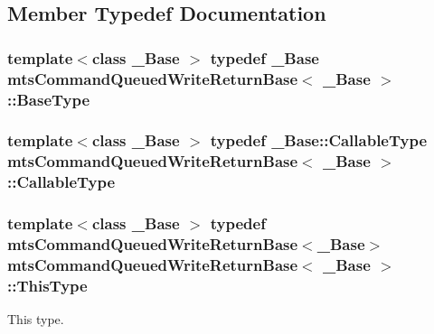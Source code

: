 \subsection{Member Typedef Documentation}
\hypertarget{classmts_command_queued_write_return_base_a1c16e3d09d9bb0071bb50f31ba81b4a8}{
\subsubsection[{Base\-Type}]{\setlength{\rightskip}{0pt plus 5cm}template$<$class \-\_\-\-Base $>$ typedef \-\_\-\-Base {\bf mts\-Command\-Queued\-Write\-Return\-Base}$<$ \-\_\-\-Base $>$\-::{\bf Base\-Type}}}\label{classmts_command_queued_write_return_base_a1c16e3d09d9bb0071bb50f31ba81b4a8}
\hypertarget{classmts_command_queued_write_return_base_aa8635b9bab77a8e15f53f9f80415c420}{
\subsubsection[{Callable\-Type}]{\setlength{\rightskip}{0pt plus 5cm}template$<$class \-\_\-\-Base $>$ typedef \-\_\-\-Base\-::\-Callable\-Type {\bf mts\-Command\-Queued\-Write\-Return\-Base}$<$ \-\_\-\-Base $>$\-::{\bf Callable\-Type}}}\label{classmts_command_queued_write_return_base_aa8635b9bab77a8e15f53f9f80415c420}
\hypertarget{classmts_command_queued_write_return_base_af2f07528dc98cd88ab385e995f95a368}{
\subsubsection[{This\-Type}]{\setlength{\rightskip}{0pt plus 5cm}template$<$class \-\_\-\-Base $>$ typedef {\bf mts\-Command\-Queued\-Write\-Return\-Base}$<$\-\_\-\-Base$>$ {\bf mts\-Command\-Queued\-Write\-Return\-Base}$<$ \-\_\-\-Base $>$\-::{\bf This\-Type}}}\label{classmts_command_queued_write_return_base_af2f07528dc98cd88ab385e995f95a368}
This type. 

